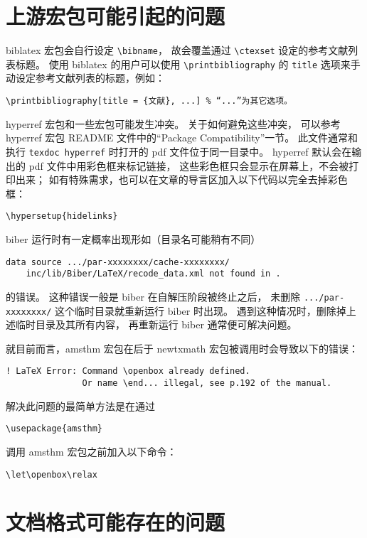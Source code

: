 \section{上游宏包可能引起的问题}

biblatex 宏包会自行设定 \verb|\bibname|，
故会覆盖通过 \verb|\ctexset| 设定的参考文献列表标题。
使用 biblatex 的用户可以使用 \verb|\printbibliography| 的
\verb|title| 选项来手动设定参考文献列表的标题，例如：
\begin{Verbatim}
\printbibliography[title = {文献}, ...] % “...”为其它选项。
\end{Verbatim}

hyperref 宏包和一些宏包可能发生冲突。
关于如何避免这些冲突，
可以参考 hyperref 宏包 README 文件中的“Package Compatibility”一节。
此文件通常和执行 \verb|texdoc hyperref|
时打开的 pdf 文件位于同一目录中。
hyperref 默认会在输出的 pdf 文件中用彩色框来标记链接，
这些彩色框只会显示在屏幕上，不会被打印出来；
如有特殊需求，也可以在文章的导言区加入以下代码以完全去掉彩色框：
\begin{Verbatim}
\hypersetup{hidelinks}
\end{Verbatim}

biber 运行时有一定概率出现形如（目录名可能稍有不同）
\begin{Verbatim}
data source .../par-xxxxxxxx/cache-xxxxxxxx/
	inc/lib/Biber/LaTeX/recode_data.xml not found in .
\end{Verbatim}
的错误。
这种错误一般是 biber 在自解压阶段被终止之后，
未删除 \verb|.../par-xxxxxxxx/| 这个临时目录就重新运行 biber 时出现。
遇到这种情况时，删除掉上述临时目录及其所有内容，
再重新运行 biber 通常便可解决问题。

就目前而言，amsthm 宏包在后于 newtxmath
宏包被调用时会导致以下的错误：
\begin{Verbatim}
! LaTeX Error: Command \openbox already defined.
               Or name \end... illegal, see p.192 of the manual.
\end{Verbatim}
解决此问题的最简单方法是在通过
\begin{Verbatim}
\usepackage{amsthm}
\end{Verbatim}
调用 amsthm 宏包之前加入以下命令：
\begin{Verbatim}
\let\openbox\relax
\end{Verbatim}

\section{文档格式可能存在的问题}

